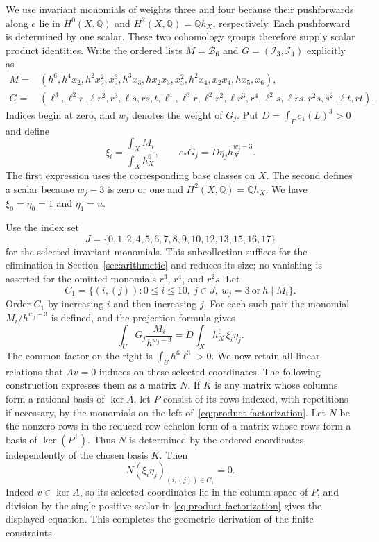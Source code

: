 We use invariant monomials of weights three and four because their
pushforwards along $e$ lie in $H^0(X,\mathbb Q)$ and
$H^2(X,\mathbb Q)=\mathbb Qh_X$, respectively. Each pushforward
is determined by one scalar. These two cohomology groups
therefore supply scalar product identities.
Write the ordered lists $M=\mathcal B_6$ and
$G=(\mathcal I_3,\mathcal I_4)$ explicitly as
\begin{align*}
 M={}&(h^6,h^4x_2,h^2x_2^2,x_2^3,h^3x_3,hx_2x_3,x_3^2,
                 h^2x_4,x_2x_4,hx_5,x_6),\\
 G={}&(\ell^3,\ell^2r,\ell r^2,r^3,\ell s,rs,t,\ell^4,
       \ell^3r,\ell^2r^2,\ell r^3,r^4,\ell^2s,\ell rs,r^2s,s^2,
       \ell t,rt).
\end{align*}
Indices begin at zero, and $w_j$ denotes the weight of $G_j$.
Put $D=\int_F c_1(L)^3>0$ and define
\begin{equation}\label{eq:normalized-products}
 \xi_i=\frac{\int_X M_i}{\int_Xh_X^6},\qquad
 e_*G_j=D\eta_jh_X^{w_j-3}.
\end{equation}
The first expression uses the corresponding base classes on $X$.
The second defines a scalar because $w_j-3$ is zero or one and
$H^2(X,\mathbb Q)=\mathbb Qh_X$. We have
$\xi_0=\eta_0=1$ and $\eta_1=u$.

Use the index set
\[
 J=\{0,1,2,4,5,6,7,8,9,10,12,13,15,16,17\}
\]
for the selected invariant monomials. This subcollection suffices for
the elimination in Section~\ref{sec:arithmetic} and reduces its size;
no vanishing is asserted for the omitted monomials $r^3$, $r^4$,
and $r^2s$. Let
\[
 C_1=\{(i,(j)):0\le i\le10,\ j\in J,
                  \ w_j=3\ \text{or}\ h\mid M_i\}.
\]
Order $C_1$ by increasing $i$ and then increasing $j$.
For each such pair the monomial $M_i/h^{w_j-3}$ is defined, and the
projection formula gives
\begin{equation}\label{eq:product-factorization}
 \int_U G_j\frac{M_i}{h^{w_j-3}}
   =D\int_Xh_X^6\,\xi_i\eta_j.
\end{equation}
The common factor on the right is $\int_U h^6\ell^3>0$.
We now retain all linear relations that $Av=0$ induces on these
selected coordinates. The following construction expresses them as
a matrix $N$.
If $K$ is any matrix whose columns form a rational basis of $\ker A$,
let $P$ consist of its rows indexed, with repetitions if necessary, by
the monomials on the left of~\eqref{eq:product-factorization}.
Let $N$ be the nonzero rows in the reduced row echelon form of a matrix
whose rows form a basis of $\ker(P^{\mathsf T})$. Thus $N$ is determined
by the ordered coordinates, independently of the chosen basis $K$.
Then
\begin{equation}\label{eq:N-products}
 N(\xi_i\eta_j)_{(i,(j))\in C_1}=0.
\end{equation}
Indeed $v\in\ker A$, so its selected coordinates lie in the column
space of $P$, and division by the single positive scalar in
\eqref{eq:product-factorization} gives the displayed equation.
This completes the geometric derivation of the finite constraints.
